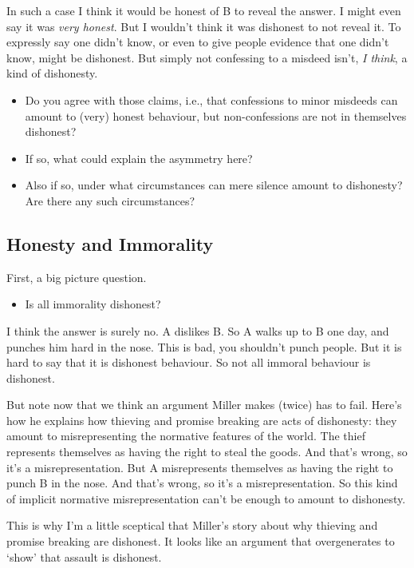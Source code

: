\documentclass[
]{article}
\providecommand{\tightlist}{%
  \setlength{\itemsep}{0pt}\setlength{\parskip}{0pt}}
\begin{document}
In such a case I think it would be honest of B to reveal the answer. I
might even say it was \emph{very honest}. But I wouldn't think it was
dishonest to not reveal it. To expressly say one didn't know, or even to
give people evidence that one didn't know, might be dishonest. But
simply not confessing to a misdeed isn't, \emph{I think}, a kind of
dishonesty.

\begin{itemize}
\tightlist
\item
  Do you agree with those claims, i.e., that confessions to minor
  misdeeds can amount to (very) honest behaviour, but non-confessions
  are not in themselves dishonest?
\item
  If so, what could explain the asymmetry here?
\item
  Also if so, under what circumstances can mere silence amount to
  dishonesty? Are there any such circumstances?
\end{itemize}

\hypertarget{honesty-and-immorality}{%
\subsection{Honesty and Immorality}\label{honesty-and-immorality}}

First, a big picture question.

\begin{itemize}
\tightlist
\item
  Is all immorality dishonest?
\end{itemize}

I think the answer is surely no. A dislikes B. So A walks up to B one
day, and punches him hard in the nose. This is bad, you shouldn't punch
people. But it is hard to say that it is dishonest behaviour. So not all
immoral behaviour is dishonest.

But note now that we think an argument Miller makes (twice) has to fail.
Here's how he explains how thieving and promise breaking are acts of
dishonesty: they amount to misrepresenting the normative features of the
world. The thief represents themselves as having the right to steal the
goods. And that's wrong, so it's a misrepresentation. But A
misrepresents themselves as having the right to punch B in the nose. And
that's wrong, so it's a misrepresentation. So this kind of implicit
normative misrepresentation can't be enough to amount to dishonesty.

This is why I'm a little sceptical that Miller's story about why
thieving and promise breaking are dishonest. It looks like an argument
that overgenerates to `show' that assault is dishonest.
\end{document}
